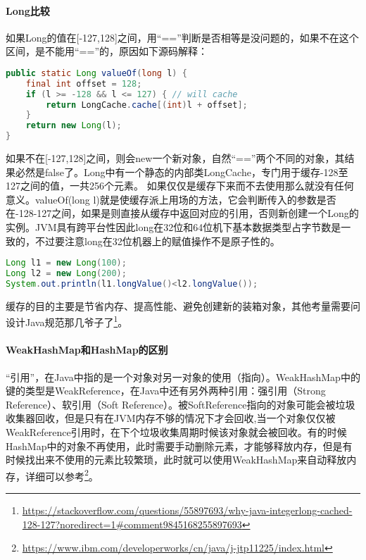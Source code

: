 \documentclass[../../../interview-questions.tex]{subfiles}
\begin{document}
\paragraph{Long比较}

如果Long的值在[-127,128]之间，用“==”判断是否相等是没问题的，如果不在这个区间，是不能用“==”的，原因如下源码解释：

\begin{lstlisting}[language=Java]
public static Long valueOf(long l) {
    final int offset = 128;
    if (l >= -128 && l <= 127) { // will cache
        return LongCache.cache[(int)l + offset];
    }
    return new Long(l);
}
\end{lstlisting}

如果不在[-127,128]之间，则会new一个新对象，自然“==”两个不同的对象，其结果必然是false了。Long中有一个静态的内部类LongCache，专门用于缓存-128至127之间的值，一共256个元素。
如果仅仅是缓存下来而不去使用那么就没有任何意义。valueOf(long l)就是使缓存派上用场的方法，它会判断传入的参数是否在-128-127之间，如果是则直接从缓存中返回对应的引用，否则新创建一个Long的实例。JVM具有跨平台性因此long在32位和64位机下基本数据类型占字节数是一致的，不过要注意long在32位机器上的赋值操作不是原子性的。

\begin{lstlisting}[language=Java]
Long l1 = new Long(100);
Long l2 = new Long(200);
System.out.println(l1.longValue()<l2.longValue());
\end{lstlisting}

缓存的目的主要是节省内存、提高性能、避免创建新的装箱对象，其他考量需要问设计Java规范那几爷子了\footnote{\url{https://stackoverflow.com/questions/55897693/why-java-integerlong-cached-128-127?noredirect=1\#comment9845168255897693}}。

\paragraph{WeakHashMap和HashMap的区别}

“引用”，在Java中指的是一个对象对另一对象的使用（指向）。WeakHashMap中的键的类型是WeakReference，在Java中还有另外两种引用：强引用（Strong Reference）、软引用（Soft Reference）。被SoftReference指向的对象可能会被垃圾收集器回收，但是只有在JVM内存不够的情况下才会回收,当一个对象仅仅被WeakReference引用时，在下个垃圾收集周期时候该对象就会被回收。有的时候HashMap中的对象不再使用，此时需要手动删除元素，才能够释放内存，但是有时候找出来不使用的元素比较繁琐，此时就可以使用WeakHashMap来自动释放内存，详细可以参考\footnote{\url{https://www.ibm.com/developerworks/cn/java/j-jtp11225/index.html}}。
\end{document}
